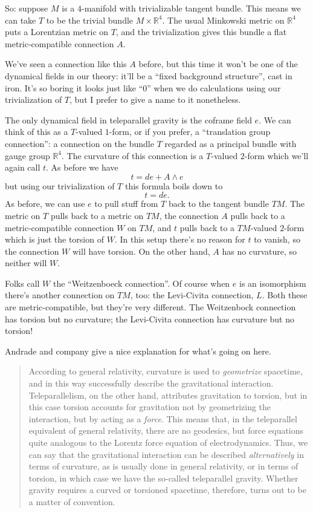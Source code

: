 \documentclass{article}
\begin{document}
So: suppose \(M\) is a \(4\)-manifold with trivializable tangent bundle.
This means we can take \(T\) to be the trivial bundle
\(M\times\mathbb{R}^4\). The usual Minkowski metric on \(\mathbb{R}^4\)
puts a Lorentzian metric on \(T\), and the trivialization gives this
bundle a flat metric-compatible connection \(A\).

We've seen a connection like this \(A\) before, but this time it won't
be one of the dynamical fields in our theory: it'll be a ``fixed
background structure'', cast in iron. It's so boring it looks just like
``\(0\)'' when we do calculations using our trivialization of \(T\), but
I prefer to give a name to it nonetheless.

The only dynamical field in teleparallel gravity is the coframe field
\(e\). We can think of this as a \(T\)-valued \(1\)-form, or if you
prefer, a ``translation group connection'': a connection on the bundle
\(T\) regarded as a principal bundle with gauge group \(\mathbb{R}^4\).
The curvature of this connection is a \(T\)-valued \(2\)-form which
we'll again call \(t\). As before we have \[t = de + A\wedge e\] but
using our trivialization of \(T\) this formula boils down to \[t = de.\]
As before, we can use \(e\) to pull stuff from \(T\) back to the tangent
bundle \(TM\). The metric on \(T\) pulls back to a metric on \(TM\), the
connection \(A\) pulls back to a metric-compatible connection \(W\) on
\(TM\), and \(t\) pulls back to a \(TM\)-valued \(2\)-form which is just
the torsion of \(W\). In this setup there's no reason for \(t\) to
vanish, so the connection \(W\) will have torsion. On the other hand,
\(A\) has no curvature, so neither will \(W\).

Folks call \(W\) the ``Weitzenboeck connection''. Of course when \(e\)
is an isomorphism there's another connection on \(TM\), too: the
Levi-Civita connection, \(L\). Both these are metric-compatible, but
they're very different. The Weitzenbock connection has torsion but no
curvature; the Levi-Civita connection has curvature but no torsion!

Andrade and company give a nice explanation for what's going on here.

\begin{quote}
According to general relativity, curvature is used to \emph{geometrize}
spacetime, and in this way successfully describe the gravitational
interaction. Teleparallelism, on the other hand, attributes gravitation
to torsion, but in this case torsion accounts for gravitation not by
geometrizing the interaction, but by acting as a \emph{force}. This
means that, in the teleparallel equivalent of general relativity, there
are no geodesics, but force equations quite analogous to the Lorentz
force equation of electrodynamics. Thus, we can say that the
gravitational interaction can be described \emph{alternatively} in terms
of curvature, as is usually done in general relativity, or in terms of
torsion, in which case we have the so-called teleparallel gravity.
Whether gravity requires a curved or torsioned spacetime, therefore,
turns out to be a matter of convention.
\end{quote}
\end{document}
